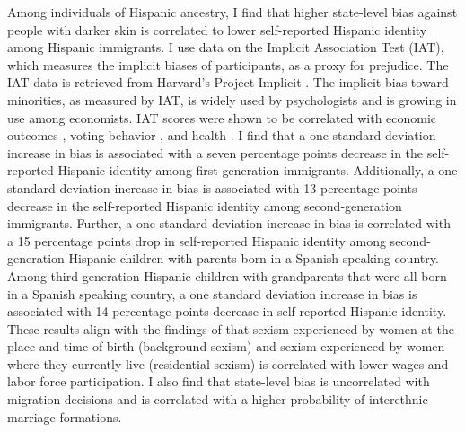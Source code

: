 \documentclass[12pt, fullpage]{article}
\begin{document}
Among individuals of Hispanic ancestry, I find that higher state-level bias against people with darker skin is correlated to lower self-reported Hispanic identity among Hispanic immigrants. I use data on the Implicit Association Test (IAT), which measures the implicit biases of participants, as a proxy for prejudice. The IAT data is retrieved from Harvard's Project Implicit \citep{greenwaldMeasuringIndividualDifferences1998}. The implicit bias toward minorities, as measured by IAT, is widely used by psychologists and is growing in use among economists. IAT scores were shown to be correlated with economic outcomes \citep{chettyRaceEconomicOpportunity2020,gloverDiscriminationSelfFulfillingProphecy2017}, voting behavior \citep{friesePredictingVotingBehavior2007}, and health \citep{leitnerRacialBiasAssociated2016}. I find that a one standard deviation increase in bias is associated with a seven percentage points decrease in the self-reported Hispanic identity among first-generation immigrants. Additionally,  a one standard deviation increase in bias is associated with 13 percentage points decrease in the self-reported Hispanic identity among second-generation immigrants. Further, a one standard deviation increase in bias is correlated with a 15 percentage points drop in self-reported Hispanic identity among second-generation Hispanic children with parents born in a Spanish speaking country. Among third-generation Hispanic children with grandparents that were all born in a Spanish speaking country, a one standard deviation increase in bias is associated with 14 percentage points decrease in self-reported Hispanic identity. These results align with the findings of \citet{charlesEffectsSexismAmerican2018} that sexism experienced by women at the place and time of birth (background sexism) and sexism experienced by women where they currently live (residential sexism) is correlated with lower wages and labor force participation. I also find that state-level bias is uncorrelated with migration decisions and is correlated with a higher probability of interethnic marriage formations.
\end{document}
